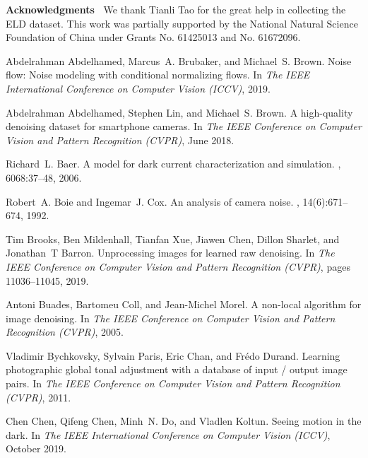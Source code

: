 \documentclass[10pt,twocolumn,letterpaper]{article}
\begin{document}
\vspace{6pt}
\noindent\textbf{Acknowledgments~}
We thank Tianli Tao for the great help in collecting the ELD dataset. This work was partially supported by the National Natural Science Foundation of China under Grants No. 61425013 and No. 61672096.

\begin{thebibliography}{10}\itemsep=-1pt

Abdelrahman Abdelhamed, Marcus~A. Brubaker, and Michael~S. Brown.
\newblock Noise flow: Noise modeling with conditional normalizing flows.
\newblock In {\em The IEEE International Conference on Computer Vision (ICCV)},
  2019.

Abdelrahman Abdelhamed, Stephen Lin, and Michael~S. Brown.
\newblock A high-quality denoising dataset for smartphone cameras.
\newblock In {\em The IEEE Conference on Computer Vision and Pattern
  Recognition (CVPR)}, June 2018.

Richard~L. Baer.
\newblock A model for dark current characterization and simulation.
, 6068:37--48, 2006.

Robert~A. Boie and Ingemar~J. Cox.
\newblock An analysis of camera noise.
,
  14(6):671--674, 1992.

Tim Brooks, Ben Mildenhall, Tianfan Xue, Jiawen Chen, Dillon Sharlet, and
  Jonathan~T Barron.
\newblock Unprocessing images for learned raw denoising.
\newblock In {\em The IEEE Conference on Computer Vision and Pattern
  Recognition (CVPR)}, pages 11036--11045, 2019.

Antoni Buades, Bartomeu Coll, and Jean-Michel Morel.
\newblock A non-local algorithm for image denoising.
\newblock In {\em The IEEE Conference on Computer Vision and Pattern
  Recognition (CVPR)}, 2005.

Vladimir Bychkovsky, Sylvain Paris, Eric Chan, and Fr{\'e}do Durand.
\newblock Learning photographic global tonal adjustment with a database of
  input / output image pairs.
\newblock In {\em The IEEE Conference on Computer Vision and Pattern
  Recognition (CVPR)}, 2011.

Chen Chen, Qifeng Chen, Minh~N. Do, and Vladlen Koltun.
\newblock Seeing motion in the dark.
\newblock In {\em The IEEE International Conference on Computer Vision (ICCV)},
  October 2019.


\end{thebibliography}
\end{document}
